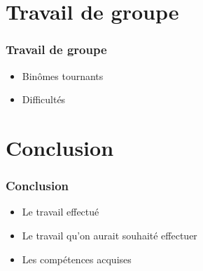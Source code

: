 \documentclass[english, french]{beamer}
\begin{document}
\section{Travail de groupe}
    \begin{frame}
        \frametitle{Travail de groupe}     
        \begin{itemize}
            \item {\Huge Binômes tournants}\vspace{1cm}
            \item {\Huge Difficultés}
        \end{itemize}
    \end{frame}

\section{Conclusion}
    \begin{frame}
        \frametitle{Conclusion}        
        \begin{itemize}
            \item Le travail effectué \pause
            \item Le travail qu'on aurait souhaité effectuer \pause
            \item Les compétences acquises
        \end{itemize}
    \end{frame}
\end{document}
